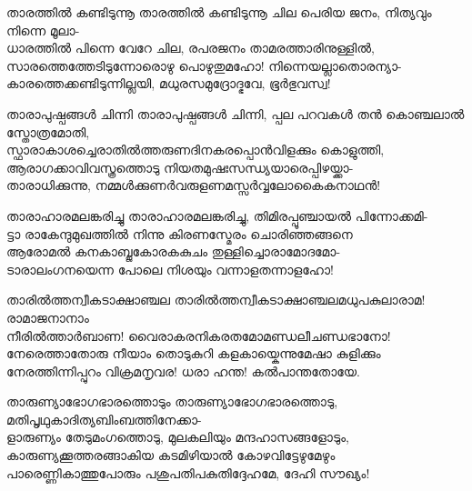 \begin{enumerate}

\begin{slokam}{\VSr}{\ONN}{താരത്തിൽ കണ്ടിടുന്നൂ}
താരത്തിൽ കണ്ടിടുന്നൂ ചില പെരിയ ജനം, നിത്യവും നിന്നെ മൂലാ-\\
ധാരത്തിൽ പിന്നെ വേറേ ചില, രപരജനം താമരത്താരിനുള്ളിൽ, \\
സാരത്തെത്തേടിടുന്നോരൊഴു പൊഴുതുമഹോ!  നിന്നെയല്ലാതൊരന്യാ-\\
കാരത്തെക്കണ്ടിടുന്നില്ലയി, മധുരസമുദ്രോദ്ഭവേ, ഭൂർഭുവസ്വ! 
\end{slokam}



\begin{slokam}{\VSr}{\VNM}{താരാപുഷ്പങ്ങൾ ചിന്നി}
താരാപുഷ്പങ്ങൾ ചിന്നി, പ്പല പറവകൾ തൻ കൊഞ്ചലാൽ സ്തോത്രമോതി,\\
സ്ഫാരാകാശച്ചെരാതിൽത്തരുണദിനകരപ്പൊൻവിളക്കും കൊളുത്തി,\\
ആരാഗക്കാവിവസ്ത്രത്തൊടു നിയതമുഷഃസന്ധ്യയാരെപ്പിഴയ്ക്കാ-\\
താരാധിക്കുന്നു, നമ്മൾക്കുണർവരുളണമസ്സർവ്വലോകൈകനാഥൻ!
\end{slokam}


\begin{slokam}{\VSv}{\VenM}{താരാഹാരമലങ്കരിച്ചു}
താരാഹാരമലങ്കരിച്ചു, തിമിരപ്പൂഞ്ചായൽ പിന്നോക്കമി-\\
ട്ടാ രാകേന്ദുമുഖത്തിൽ നിന്നു കിരണസ്മേരം ചൊരിഞ്ഞങ്ങനെ\\
ആരോമൽ കനകാബ്ജകോരകകുചം തുള്ളിച്ചൊരാമോദമോ-\\
ടാരാലംഗനയെന്ന പോലെ നിശയും വന്നാളതന്നാളഹോ!
\end{slokam}


\begin{slokam}{\VSr}{\Punam}{താരിൽത്തന്വീകടാക്ഷാഞ്ചല}
താരിൽത്തന്വീകടാക്ഷാഞ്ചലമധുപകുലാരാമ! രാമാജനാനാം\\
നീരിൽത്താർബാണ! വൈരാകരനികരതമോമണ്ഡലീചണ്ഡഭാനോ!\\
നേരെത്താതോരു നീയാം തൊടുകുറി കളകായ്കെന്നുമേഷാ കുളിക്കും\\
നേരത്തിന്നിപ്പുറം വിക്രമനൃവര! ധരാ ഹന്ത! കൽപാന്തതോയേ.
\end{slokam}


\begin{slokam}{\VSr}{\Unk}{താരുണ്യാഭോഗഭാരത്തൊടും}
താരുണ്യാഭോഗഭാരത്തൊടു, മതിപൃഥുകാദിത്യബിംബത്തിനേക്കാ-\\
ളാരുണ്യം തേടുമംഗത്തൊടു, മുലകലിയും മന്ദഹാസങ്ങളോടും,\\
കാരുണ്യക്കൂത്തരങ്ങാകിയ കടമിഴിയാൽ കോഴവിട്ടേഴുമേഴും\\
പാരെണ്ണികാത്തുപോരും പശുപതിപകുതിദ്ദേഹമേ, ദേഹി സൗഖ്യം!
\end{slokam}


\end{enumerate}
